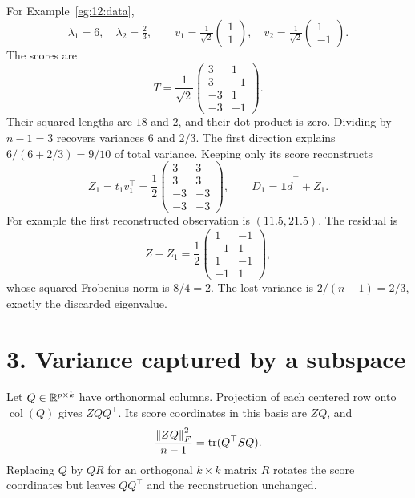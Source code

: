 \begin{example}\label{eg:12:scores}
For Example~\ref{eg:12:data},
\[
\lambda_1=6,\quad \lambda_2=\tfrac23,\qquad
v_1=\tfrac1{\sqrt2}\begin{pmatrix}1\\1\end{pmatrix},\quad
v_2=\tfrac1{\sqrt2}\begin{pmatrix}1\\-1\end{pmatrix}.
\]
The scores are
\[
T=\frac1{\sqrt2}\begin{pmatrix}3&1\\3&-1\\-3&1\\-3&-1\end{pmatrix}.
\]
Their squared lengths are $18$ and $2$, and their dot product is zero.
Dividing by $n-1=3$ recovers variances $6$ and $2/3$.
The first direction explains $6/(6+2/3)=9/10$ of total variance.
Keeping only its score reconstructs
\[
Z_1=t_1v_1^\top=\frac12\begin{pmatrix}3&3\\3&3\\-3&-3\\-3&-3\end{pmatrix},\qquad
D_1=\mathbf1\bar d^\top+Z_1.
\]
For example the first reconstructed observation is $(11.5,21.5)$.
The residual is
\[
Z-Z_1=\frac12\begin{pmatrix}1&-1\\-1&1\\1&-1\\-1&1\end{pmatrix},
\]
whose squared Frobenius norm is $8/4=2$.
The lost variance is $2/(n-1)=2/3$, exactly the discarded eigenvalue.
\end{example}

\section*{3. Variance captured by a subspace}
Let $Q\in\mathbb R^{p\times k}$ have orthonormal columns.
Projection of each centered row onto $\operatorname{col}(Q)$ gives
$ZQQ^\top$. Its score coordinates in this basis are $ZQ$, and
\[
\frac{\left\lVert ZQ\right\rVert_F^2}{n-1}=\operatorname{tr}(Q^\top SQ).
\]
Replacing $Q$ by $QR$ for an orthogonal $k\times k$ matrix $R$ rotates
the score coordinates but leaves $QQ^\top$ and the reconstruction unchanged.

